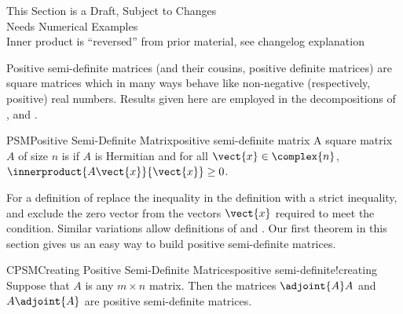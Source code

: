 %
{\sc\large This Section is a Draft, Subject to Changes}\\
{\sc\large Needs Numerical Examples}\\
{\sc\large Inner product is ``reversed'' from prior material, see changelog explanation}\par\bigskip
%
Positive semi-definite matrices (and their cousins, positive definite matrices) are square matrices which in many ways behave like non-negative (respectively, positive) real numbers.  Results given here are employed in the decompositions of ,  and .
%
%
\begin{definition}{PSM}{Positive Semi-Definite Matrix}{positive semi-definite matrix}
A square matrix $A$ of size $n$ is  if $A$ is Hermitian and for all $\vect{x}\in\complex{n}$, $\innerproduct{A\vect{x}}{\vect{x}}\geq 0$.
\end{definition}
%
For a definition of  replace the inequality in the definition with a strict inequality, and exclude the zero vector from the vectors $\vect{x}$ required to meet the condition.  Similar variations allow definitions of  and .
%
%
Our first theorem in this section gives us an easy way to build positive semi-definite matrices.
%
\begin{theorem}{CPSM}{Creating Positive Semi-Definite Matrices}{positive semi-definite!creating}
Suppose that $A$ is any $m\times n$ matrix.  Then the matrices $\adjoint{A}A$ and $A\adjoint{A}$ are positive semi-definite matrices.
\end{theorem}
%
